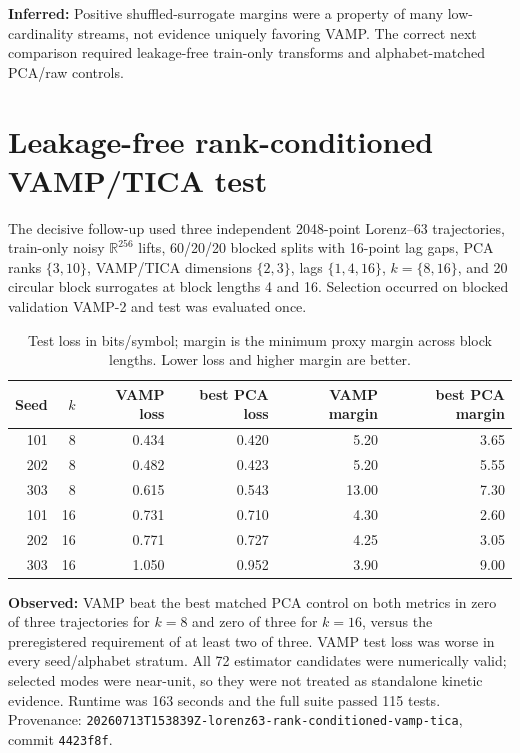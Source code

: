 \documentclass[11pt]{article}
\newcommand{\observed}{\textbf{Observed:}}
\newcommand{\inferred}{\textbf{Inferred:}}
\begin{document}
\inferred{} Positive shuffled-surrogate margins were a property of many
low-cardinality streams, not evidence uniquely favoring VAMP. The correct next
comparison required leakage-free train-only transforms and alphabet-matched
PCA/raw controls.

\section{Leakage-free rank-conditioned VAMP/TICA test}

The decisive follow-up used three independent 2048-point Lorenz--63
trajectories, train-only noisy $\mathbb{R}^{256}$ lifts, 60/20/20 blocked splits
with 16-point lag gaps, PCA ranks $\{3,10\}$, VAMP/TICA dimensions $\{2,3\}$,
lags $\{1,4,16\}$, $k=\{8,16\}$, and 20 circular block surrogates at block
lengths 4 and 16. Selection occurred on blocked validation VAMP-2 and test was
evaluated once.

\begin{table}[ht]
\centering\small
\begin{tabular}{rrrrrr}
\toprule
Seed & $k$ & VAMP loss & best PCA loss & VAMP margin & best PCA margin \\
\midrule
101 & 8 & 0.434 & 0.420 & 5.20 & 3.65 \\
202 & 8 & 0.482 & 0.423 & 5.20 & 5.55 \\
303 & 8 & 0.615 & 0.543 & 13.00 & 7.30 \\
101 & 16 & 0.731 & 0.710 & 4.30 & 2.60 \\
202 & 16 & 0.771 & 0.727 & 4.25 & 3.05 \\
303 & 16 & 1.050 & 0.952 & 3.90 & 9.00 \\
\bottomrule
\end{tabular}
\caption{Test loss in bits/symbol; margin is the minimum proxy margin across
block lengths. Lower loss and higher margin are better.}
\end{table}

\observed{} VAMP beat the best matched PCA control on both metrics in zero of
three trajectories for $k=8$ and zero of three for $k=16$, versus the
preregistered requirement of at least two of three. VAMP test loss was worse in
every seed/alphabet stratum. All 72 estimator candidates were numerically valid;
selected modes were near-unit, so they were not treated as standalone kinetic
evidence. Runtime was 163 seconds and the full suite passed 115 tests.
Provenance: \texttt{20260713T153839Z-lorenz63-rank-conditioned-vamp-tica},
commit \texttt{4423f8f}.
\end{document}
